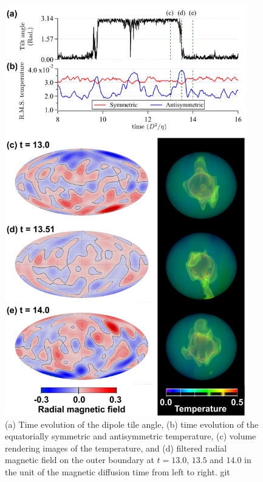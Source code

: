 \begin{figure}[ht]
\begin{center}
\includegraphics*[width=105mm]
{Figures/Figure2_again2.png}
\end{center}
\caption{
(a) Time evolution of the dipole tile angle, (b) time evolution of the equatorially symmetric and antisymmetric temperature, (c) volume rendering images of the temperature, and (d) filtered radial magnetic field on the outer boundary at $t = 13.0$, $13.5$ and $14.0$ in the unit of the magnetic diffusion time from left to right.
git}
\label{fig:temperature_rendering}
\end{figure}